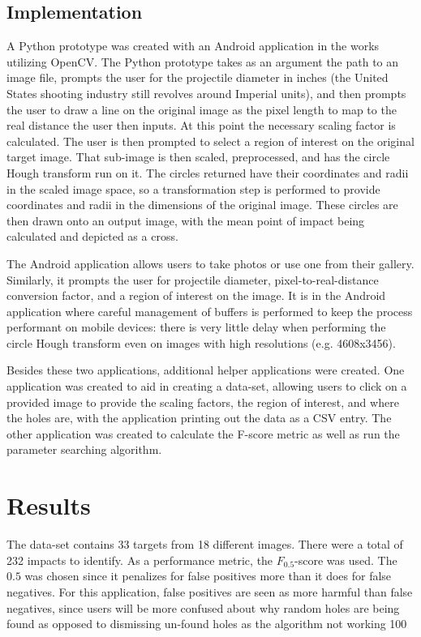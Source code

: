 \documentclass{article}
\begin{document}
\subsection{Implementation}
\label{ssec:implementation}

A Python prototype was created with an Android application in the works utilizing OpenCV.
The Python prototype takes as an argument the path to an image file, prompts
the user for the projectile diameter in inches (the United States shooting industry
still revolves around Imperial units), and then prompts the user to draw a line
on the original image as the pixel length to map to the real distance the user then inputs.
At this point the necessary scaling factor is calculated.
The user is then prompted to select a region of interest on the original target image.
That sub-image is then scaled, preprocessed, and has the circle Hough transform run on it.
The circles returned have their coordinates and radii in the scaled image space, so a
transformation step is performed to provide coordinates and radii in the dimensions of
the original image. These circles are then drawn onto an output image, with the mean
point of impact being calculated and depicted as a cross.

The Android application allows users to take photos or use one from their gallery. Similarly,
it prompts the user for projectile diameter, pixel-to-real-distance conversion factor, and
a region of interest on the image. It is in the Android application where careful management
of buffers is performed to keep the process performant on mobile devices:
there is very little delay when performing the circle Hough transform even on
images with high resolutions (e.g. 4608x3456).

Besides these two applications, additional helper applications were created. One application
was created to aid in creating a data-set, allowing users to click on a provided image
to provide the scaling factors, the region of interest, and where the holes are, with the application
printing out the data as a CSV entry. The other application was created to calculate the F-score
metric as well as run the parameter searching algorithm.

\section{Results}
\label{sec:results}

The data-set contains 33 targets from 18 different images. There were a total of 232 impacts
to identify. As a performance metric, the \(F_{0.5}\)-score was used. The \(0.5\) was chosen
since it penalizes for false positives more than it does for false negatives.
For this application, false positives are seen as more harmful than false negatives, since users
will be more confused about why random holes are being found as opposed to dismissing un-found
holes as the algorithm not working 100%
\end{document}
